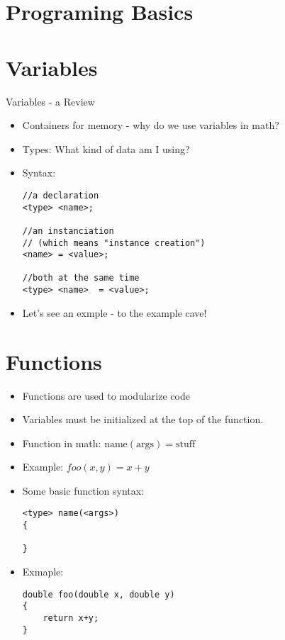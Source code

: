 \documentclass[main.tex]{subfile}
\begin{document}


\section{Programing Basics} 
\label{sec:programing_basics}

\section{Variables}
\label{sec:variables_scope_and_arrays}

\begin{frame}[fragile]{Variables - a Review}
	\begin{itemize}
		\item Containers for memory - why do we use variables in math?
		\item Types: What kind of data am I using?
		\item Syntax:
			\begin{lstlisting}
//a declaration
<type> <name>; 

//an instanciation 
// (which means "instance creation")
<name> = <value>;

//both at the same time
<type> <name>  = <value>;
			\end{lstlisting}
		\item Let's see an exmple - to the example cave!
	\end{itemize}
\end{frame}


\section{Functions} 
\label{sec:functions}

\begin{frame}
	\begin{itemize}
		\item Functions are used to modularize code
		\item Variables must be initialized at the top of the function.
	\end{itemize}
\end{frame}

\begin{frame}[fragile]
	\begin{itemize}
		\item Function in math: $\text{name}(\text{args}) = \text{stuff}$
		\item Example: $foo(x,y) = x+y$
		\item Some basic function syntax:
	\begin{lstlisting}
<type> name(<args>)
{

}
	\end{lstlisting}
	\item Exmaple: 
		\begin{lstlisting}
double foo(double x, double y)
{
	return x+y;
}
		\end{lstlisting}
	\end{itemize}
\end{frame}
\end{document}
